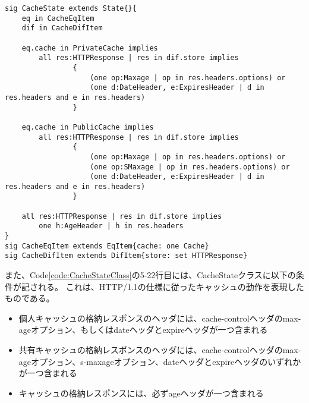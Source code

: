 \documentclass[12pt,a4paper]{jbook}
\begin{document}
\begin{lstlisting}[caption=キャッシュの状態を表すクラス, label=code:CacheStateClass]
sig CacheState extends State{}{
	eq in CacheEqItem
	dif in CacheDifItem

	eq.cache in PrivateCache implies
        all res:HTTPResponse | res in dif.store implies
                {
                    (one op:Maxage | op in res.headers.options) or
                    (one d:DateHeader, e:ExpiresHeader | d in res.headers and e in res.headers)
                }

    eq.cache in PublicCache implies
        all res:HTTPResponse | res in dif.store implies
                {
                    (one op:Maxage | op in res.headers.options) or
                    (one op:SMaxage | op in res.headers.options) or
                    (one d:DateHeader, e:ExpiresHeader | d in res.headers and e in res.headers)
                }

    all res:HTTPResponse | res in dif.store implies
        one h:AgeHeader | h in res.headers
}
sig CacheEqItem extends EqItem{cache: one Cache}
sig CacheDifItem extends DifItem{store: set HTTPResponse}
\end{lstlisting}

また、Code\ref{code:CacheStateClass}の5-22行目には、CacheStateクラスに以下の条件が記される。
これは、HTTP/1.1の仕様に従ったキャッシュの動作を表現したものである。
\begin{itemize}
\item 個人キャッシュの格納レスポンスのヘッダには、cache-controlヘッダのmax-ageオプション、もしくはdateヘッダとexpireヘッダが一つ含まれる
\item 共有キャッシュの格納レスポンスのヘッダには、cache-controlヘッダのmax-ageオプション、s-maxageオプション、dateヘッダとexpireヘッダのいずれかが一つ含まれる
\item キャッシュの格納レスポンスには、必ずageヘッダが一つ含まれる
\end{itemize}
\end{document}
